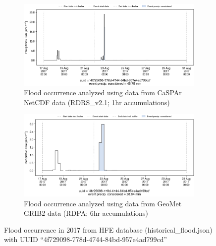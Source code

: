 \documentclass[10pt,a4paper,titlepage,parskip]{scrartcl}
\begin{document}
\begin{figure}[h]
	\begin{subfigure}[a]{1.0\textwidth}
		\centering
		\includegraphics[width=\linewidth]{figures/compare_Geomet_CaSPAr/interpolated_at_stations_occurrence_963_identified-timesteps_RDRS_v2.1.png}
		\caption{Flood occurrence analyzed using data from CaSPAr NetCDF data (RDRS\_v2.1; 1hr accumulations)}
	\end{subfigure}
	\par\bigskip\bigskip
	\begin{subfigure}[b]{1.0\textwidth}
		\centering
		\includegraphics[width=\linewidth]{figures/compare_Geomet_CaSPAr/interpolated_at_stations_occurrence_963_identified-timesteps_rdpa:10km:6f.png}
		\caption{Flood occurrence analyzed using data from GeoMet GRIB2 data (RDPA; 6hr accumulations)}
	\end{subfigure}
	\par\bigskip\bigskip
	\caption{Flood occurrence in 2017 from HFE database (historical\_flood.json) with UUID ``4f729098-778d-4744-84bd-957e4ad799cd''}
\end{figure}
\pagebreak
\end{document}
